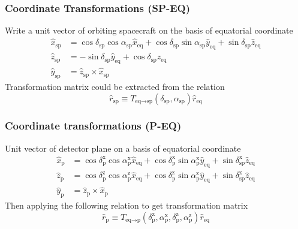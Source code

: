 \documentclass{beamer}
\begin{document}
\begin{frame}\frametitle{Coordinate Transformations (SP-EQ)}
  Write a unit vector of orbiting spacecraft on the basis of equatorial coordinate
  \begin{equation}
    \begin{split}
    \hat{x}_\text{sp} &= \cos\delta_\text{sp}\cos\alpha_\text{sp}\hat{x}_\text{eq} + \cos\delta_\text{sp}\sin\alpha_\text{sp}\hat{y}_\text{eq} + \sin\delta_\text{sp}\hat{z}_\text{eq}\\
    \hat{z}_\text{sp} &= - \sin\delta_\text{sp}\hat{y}_\text{eq} + \cos\delta_\text{sp}\hat{z}_\text{eq} \\
    \hat{y}_\text{sp} &= \hat{z}_\text{sp} \times \hat{x}_\text{sp}
    \end{split}
    \label{eq:tf_eq_sp}
  \end{equation}
  Transformation matrix could be extracted from the relation
  \begin{equation}
    \hat{r}_\text{sp} \equiv T_{\text{eq}\rightarrow\text{sp}} (\delta_\text{sp}, \alpha_\text{sp}) \hat{r}_\text{eq}
  \end{equation}
\end{frame}
\begin{frame}\frametitle{Coordinate transformations (P-EQ)}
Unit vector of detector plane on a basis of equatorial coordinate
\begin{equation}
  \begin{split}
  \hat{x}_\text{p} &= \cos\delta^\text{x}_\text{p}\cos\alpha^\text{x}_\text{p}\hat{x}_\text{eq} + \cos\delta^\text{x}_\text{p}\sin\alpha^\text{x}_\text{p}\hat{y}_\text{eq} + \sin\delta^\text{x}_\text{sp}\hat{z}_\text{eq}\\
  \hat{z}_\text{p} &= \cos\delta^\text{z}_\text{p}\cos\alpha^\text{z}_\text{p}\hat{x}_\text{eq} + \cos\delta^\text{z}_\text{p}\sin\alpha^\text{z}_\text{p}\hat{y}_\text{eq} + \sin\delta^\text{z}_\text{sp}\hat{z}_\text{eq}\\
  \hat{y}_\text{p} &= \hat{z}_\text{p} \times \hat{x}_\text{p}
  \end{split}
  \label{eq:tf_eq_p}
\end{equation}
Then applying the following relation to get transformation matrix
\begin{equation}
  \hat{r}_\text{p} \equiv T_{\text{eq}\rightarrow\text{p}} (\delta^\text{x}_\text{p}, \alpha^\text{x}_\text{p}, \delta^\text{z}_\text{p}, \alpha^\text{z}_\text{p}) \hat{r}_\text{eq}
\end{equation}
\end{frame}
\end{document}
